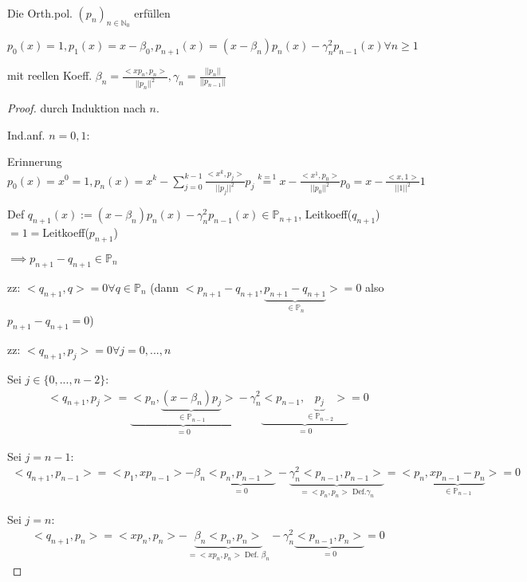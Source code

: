 \begin{lemma}
	Die Orth.pol. $(p_n)_{n \in \mathbb{N}_0}$ erfüllen
	
	$p_0(x) = 1, p_1(x) = x-\beta_0, p_{n+1}(x) = (x-\beta_n) p_n(x) - \gamma_n^2 p_{n-1}(x) \forall n \geq 1$
	
	mit reellen Koeff. $\beta_n = \frac{<xp_n, p_n>}{||p_n||^2}, \gamma_n = \frac{||p_n||}{||p_{n-1}||}$
\end{lemma}

\begin{proof}
	durch Induktion nach $n$.
	
	Ind.anf. $n=0,1$:
	
	Erinnerung $p_0(x) = x^0 = 1, p_n(x) = x^k - \sum_{j=0}^{k-1} \frac{<x^k, p_j>}{||p_j||^2} p_j \overset{k=1}{=} x - \frac{<x^1, p_0>}{||p_0||^2} p_0 = x - \frac{<x, 1>}{||1||^2} 1$
	
	Def $q_{n+1}(x) := (x- \beta_n) p_n(x) - \gamma_n^2 p_{n-1}(x) \in \mathbb{P}_{n+1}$, Leitkoeff($q_{n+1}$)$=1=$Leitkoeff($p_{n+1}$)
	
	$\implies p_{n+1} - q_{n+1} \in \mathbb{P}_n$%
	
	zz: $<q_{n+1}, q> = 0 \forall q \in \mathbb{P}_n$ (dann $<p_{n+1} - q_{n+1}, \underbrace{p_{n+1} - q_{n+1}}_{\in \mathbb{P}_n}> = 0$ also $p_{n+1} - q_{n+1} = 0$)
	
	zz: $<q_{n+1}, p_j> = 0 \forall j=0, ..., n$
	
	Sei $j \in \{0, ..., n-2\}$:
	\begin{align*}
		<q_{n+1}, p_j> = \underbrace{<p_n, \underbrace{(x - \beta_n) p_j}_{\in \mathbb{P}_{n-1}}>}_{=0} - \gamma_n^2 \underbrace{<p_{n-1}, \underbrace{p_j}_{\in \mathbb{P}_{n-2}}>}_{=0} = 0
	\end{align*}
	
	Sei $j = n-1:$
	\begin{align*}
		<q_{n+1}, p_{n-1}> = <p_1, xp_{n-1}> - \beta_n \underbrace{<p_n, p_{n-1}>}_{=0} - \underbrace{\gamma_n^2 <p_{n-1}, p_{n-1}>}_{=<p_n, p_n> \text{ Def.} \gamma_n} = <p_n, \underbrace{xp_{n-1} - p_n}_{\in \mathbb{P}_{n-1}}> = 0
	\end{align*}
	
	Sei $j=n$:
	\begin{align*}
		<q_{n+1}, p_n> = <xp_n, p_n> - \underbrace{\beta_n <p_n, p_n>}_{=<xp_n, p_n> \text{ Def. } \beta_n} - \gamma_n^2 \underbrace{<p_{n-1}, p_n>}_{=0} = 0
	\end{align*}
\end{proof}

